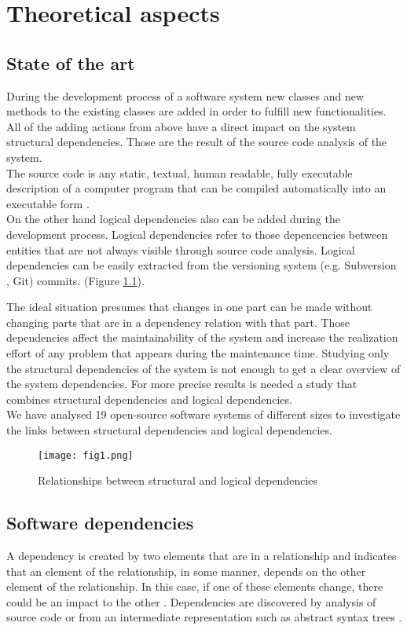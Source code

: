 \chapter{Theoretical aspects}

\section {State of the art}

\tab During the development process of a software system new classes and new methods to the existing classes are added in order to fulﬁll new functionalities. All of the adding actions from above have a direct impact on the system structural dependencies. Those are the result of the source code analysis of the system. \\The source code is any static, textual, human readable, fully executable description of a computer program that can be compiled automatically into an executable form \cite{ct1}.\\On the other hand logical dependencies also can be added during the development process. Logical dependencies refer to those depencencies between entities that are not always visible through source code analysis. Logical dependencies can be easily extracted from the versioning system (e.g. Subversion , Git) commits.  (Figure \ref{fig:fig1}).

\tab The ideal situation presumes that changes in one part can be made without changing parts that are in a dependency relation with that part. Those dependencies aﬀect the maintainability of the system and increase the realization eﬀort of any problem that appears during the maintenance time. Studying only the structural dependencies of the system is not enough to get a clear overview of the system dependencies. For more precise results is needed a study that combines structural dependencies and logical dependencies. \\ We have analysed 19 open-source software systems of diﬀerent sizes to investigate the links between structural dependencies and logical dependencies. 


\begin{figure}[h]
\centering
\texttt{[image: fig1.png]}
\caption{Relationships between structural and logical dependencies }
\label{fig:fig1}
\centering
\end{figure}

\section{Software dependencies}
\tab A dependency is created by two elements that are in a relationship and indicates that an element of the relationship, in some manner, depends on the other element of the relationship. In this case, if one of these elements change, there could be an impact to the other \cite{ct2}. Dependencies are discovered by analysis of source code or from an intermediate representation such as abstract syntax trees \cite{ct3} .

